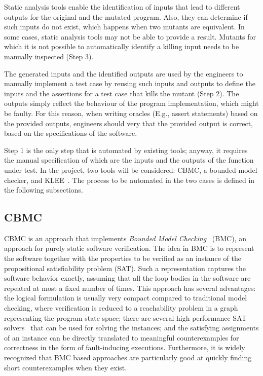 



Static analysis tools enable the identification of inputs that lead to different outputs for the original and the mutated program.
Also, they can determine if such inputs do not exist, which happens when two mutants are equivalent.
In some cases, static analysis tools may not be able to provide a result.
Mutants for which it is not possible to automatically identify a killing input needs to be manually inspected (Step 3).
 
 The generated inputs and the identified outputs are used by the engineers to manually implement a test case by reusing such inputs and outputs to define the inputs and the assertions for a test case that kills the mutant (Step 2).  The outputs simply reflect the behaviour of the program implementation, which might be faulty. For this reason, when writing oracles (E.g., assert statements) based on the provided outputs, engineers should very that the provided output is correct, based on the specifications of the software.
 


Step 1 is the only step that is automated by existing tools; anyway, it requires the manual specification of which are the inputs and the outputs of the function under test. In the project, two tools will be considered: CBMC, a bounded model checker, and KLEE~\cite{cadar2008klee}. The process to be automated in the two cases is defined in the following subsections.

\subsection{CBMC}
\label{subsec:cbmc}

CBMC is an approach that implements {\em Bounded Model
Checking}~\cite{BiereCCZ:TACAS99,SeryFS:ATVA12} (BMC), an approach for purely static software verification.
The idea in BMC is to represent the software together with the
properties to be verified as an instance of the propositional
satisfiability problem (SAT).  Such a representation captures the
software behavior exactly, assuming that all the loop bodies in the
software are repeated at most a fixed number of times.
%
This approach has several advantages: the logical formulation is usually
very compact compared to traditional model checking, where verification
is reduced to a reachability problem in a graph representing the program
state space;
%
there are several high-performance SAT
solvers~\cite{MarquesSilva:IEEETRAN99,EenS:SAT2003} that can be used for
solving the instances;
%
and the satisfying assignments of an instance can be directly translated
to meaningful counterexamples for correctness in the form of
fault-inducing executions.
%
Furthermore, it is widely recognized that BMC based approaches are particularly good
at quickly finding short counterexamples when they exist.


